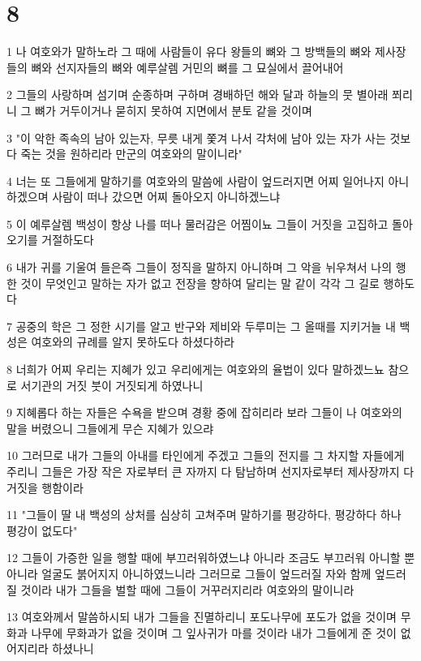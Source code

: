 \chapter{8}

\par 1 나 여호와가 말하노라 그 때에 사람들이 유다 왕들의 뼈와 그 방백들의 뼈와 제사장들의 뼈와 선지자들의 뼈와 예루살렘 거민의 뼈를 그 묘실에서 끌어내어
\par 2 그들의 사랑하며 섬기며 순종하며 구하며 경배하던 해와 달과 하늘의 뭇 별아래 쬐리니 그 뼈가 거두이거나 묻히지 못하여 지면에서 분토 같을 것이며
\par 3 "이 악한 족속의 남아 있는자, 무릇 내게 쫓겨 나서 각처에 남아 있는 자가 사는 것보다 죽는 것을 원하리라 만군의 여호와의 말이니라"
\par 4 너는 또 그들에게 말하기를 여호와의 말씀에 사람이 엎드러지면 어찌 일어나지 아니하겠으며 사람이 떠나 갔으면 어찌 돌아오지 아니하겠느냐
\par 5 이 예루살렘 백성이 항상 나를 떠나 물러감은 어찜이뇨 그들이 거짓을 고집하고 돌아오기를 거절하도다
\par 6 내가 귀를 기울여 들은즉 그들이 정직을 말하지 아니하며 그 악을 뉘우쳐서 나의 행한 것이 무엇인고 말하는 자가 없고 전장을 향하여 달리는 말 같이 각각 그 길로 행하도다
\par 7 공중의 학은 그 정한 시기를 알고 반구와 제비와 두루미는 그 올때를 지키거늘 내 백성은 여호와의 규례를 알지 못하도다 하셨다하라
\par 8 너희가 어찌 우리는 지혜가 있고 우리에게는 여호와의 율법이 있다 말하겠느뇨 참으로 서기관의 거짓 붓이 거짓되게 하였나니
\par 9 지혜롭다 하는 자들은 수욕을 받으며 경황 중에 잡히리라 보라 그들이 나 여호와의 말을 버렸으니 그들에게 무슨 지혜가 있으랴
\par 10 그러므로 내가 그들의 아내를 타인에게 주겠고 그들의 전지를 그 차지할 자들에게 주리니 그들은 가장 작은 자로부터 큰 자까지 다 탐남하며 선지자로부터 제사장까지 다 거짓을 행함이라
\par 11 "그들이 딸 내 백성의 상처를 심상히 고쳐주며 말하기를 평강하다, 평강하다 하나 평강이 없도다"
\par 12 그들이 가증한 일을 행할 때에 부끄러워하였느냐 아니라 조금도 부끄러워 아니할 뿐 아니라 얼굴도 붉어지지 아니하였느니라 그러므로 그들이 엎드러질 자와 함께 엎드러질 것이라 내가 그들을 벌할 때에 그들이 거꾸러지리라 여호와의 말이니라
\par 13 여호와께서 말씀하시되 내가 그들을 진멸하리니 포도나무에 포도가 없을 것이며 무화과 나무에 무화과가 없을 것이며 그 잎사귀가 마를 것이라 내가 그들에게 준 것이 없어지리라 하셨나니
